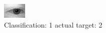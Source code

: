 \begin{figure}[h!]
\begin{center}
\includegraphics[width=0.60\columnwidth]{figures/ID430_class_1_target_2.png}
\end{center}
\caption{ Classification: 1 actual target: 2}
\label{fig:ID430_class_1_target_2}
\end{figure}
